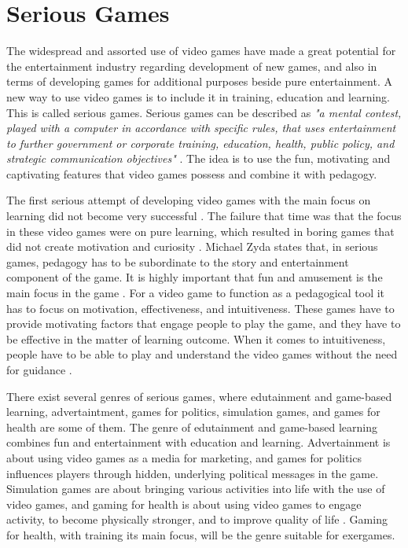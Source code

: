 \section{Serious Games}
\label{sec:sergames}
The widespread and assorted use of video games have made a great potential for the entertainment industry regarding development of new games, and also in terms of developing games for additional purposes beside pure entertainment. A new way to use video games is to include it in training, education and learning. This is called serious games. Serious games can be described as \emph{"a mental contest, played with a computer in accordance with specific rules, that uses entertainment to further government or corporate training, education, health, public policy, and strategic communication objectives"} \cite{zyda2005visual}. The idea is to use the fun, motivating and captivating features that video games possess and combine it with pedagogy.

The first serious attempt of developing video games with the main focus on learning did not become very successful \cite{understandingvg}. The failure that time was that the focus in these  video games were on pure learning, which resulted in boring games that did not create motivation and curiosity \cite{understandingvg} \cite{susi2007serious}. Michael Zyda states that, in serious games, pedagogy has to be subordinate to the story and entertainment component of the game. It is highly important that fun and amusement is the main focus in the game \cite{zyda2005visual}. For a video game to function as a pedagogical tool it has to focus on motivation, effectiveness, and intuitiveness. These games have to provide motivating factors that engage people to play the game, and they have to be effective in the matter of learning outcome. When it comes to intuitiveness, people have to be able to play and understand the video games without the need for guidance \cite{understandingvg}. 

There exist several genres of serious games, where edutainment and game-based learning, advertaintment, games for politics, simulation games, and games for health are some of them. The genre of edutainment and game-based learning combines fun and entertainment with education and learning. Advertainment is about using video games as a media for marketing, and games for politics influences players through hidden, underlying political messages in the game. Simulation games are about bringing various activities into life with the use of video games, and gaming for health is about using video games to engage activity, to become physically stronger, and to improve quality of life \cite{understandingvg} \cite{alfingewang}. Gaming for health, with training its main focus, will be the genre suitable for exergames.

